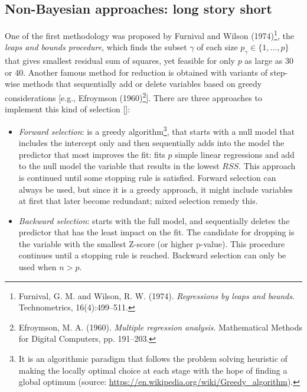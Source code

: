 \documentclass[11 pt]{article}
\begin{document}
\begin{multicols}{2}
\section{Non-Bayesian approaches: long story short}

One of the first methodology was proposed by Furnival and Wilson (1974)\footnote{Furnival, G. M. and Wilson, R. W. (1974). \textit{Regressions by leaps and bounds}. Technometrics, 16(4):499–511.}, the \textit{leaps and bounds procedure}, which finds the subset $\gamma$ of each size $p_\gamma \in \{1,...,p\}$ that gives smallest residual sum of squares, yet feasible for only $p$ as large as 30 or 40. Another famous method for reduction is obtained with variants of step-wise methods that sequentially add or delete variables based on greedy considerations [e.g., Efroymson (1960)\footnote{Efroymson, M. A. (1960).  \textit{Multiple regression analysis}. Mathematical  Methods  for  Digital Computers, pp. 191–203.}]. There are three  approaches to implement this kind of selection [\cite{ESL}]:
\begin{itemize}
    \item \textit{Forward selection}: is a greedy algorithm\footnote{It is an algorithmic paradigm that follows the problem solving heuristic of making the locally optimal choice at each stage with the hope of finding a global optimum (source: \url{https://en.wikipedia.org/wiki/Greedy_algorithm}).}, that starts with a null model that includes the intercept only and then sequentially adds into the model the predictor that most improves the fit: fits $p$ simple linear regressions and add to the null model the variable that results in the lowest $RSS$. This approach is continued until some stopping rule is satisfied. Forward selection can always be used, but since it is a greedy approach, it might include variables at first that later become redundant; mixed selection remedy this.
    
    \item \textit{Backward selection}: starts with the full model, and sequentially deletes the predictor that has the least impact on the fit. The candidate for dropping is the variable with the smallest Z-score (or higher p-value). This procedure continues until a stopping rule is reached. Backward selection can only be used when $n>p$.
    

\end{itemize}
\end{multicols}
\end{document}
